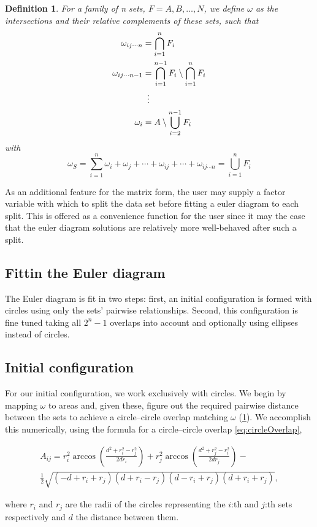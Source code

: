 \documentclass[a4paper,nofonts,nobib,titlepage,justified,marginals=raggedouter,nohyper]{tufte-handout}\usepackage[]{graphicx}\usepackage[]{color}
\newtheorem{mydef}{Definition}
\begin{document}
\begin{mydef}
\label{def:omega}
For a family of \emph{n} sets, $F = A, B, \dots, N$, we define $\omega$ as the
intersections and their relative complements of these sets, such that
\begin{align*}
  \omega_{ij \cdots n}   & = \bigcap_{i=1}^n F_i  \\
  \omega_{ij \cdots n-1} & = \bigcap_{i=1}^{n-1}F_i \setminus \bigcap_{i=1}^{n}F_i \\
                         & \vdotswithin{=} \\
                \omega_i & = A \setminus \bigcup_{i=2}^{n-1}F_i
\end{align*}
with
\[
  \omega_S = \sum_{i = 1}^n \omega_i + \omega_j + \cdots +  \omega_{ij} + \cdots + \omega_{ij\cdots n} =  \bigcup_{i=1}^n F_i
\]
\end{mydef}

As an additional feature for the matrix form, the user may supply a
factor variable with which to split the data set before fitting a euler
diagram to each split. This is offered as a convenience function for the user
since it may the case that the euler diagram solutions are relatively more
well-behaved after such a split.

\subsection{Fittin the Euler diagram}

The Euler diagram is fit in two steps: first, an initial configuration is
formed with circles using only the sets' pairwise relationships. Second, this
configuration is fine tuned taking all $2^n-1$ overlaps into account and
optionally using ellipses instead of circles.

\subsection{Initial configuration}
\label{sec:initConfig}

For our initial configuration, we work exclusively with circles. We begin by
mapping $\omega$ to areas and, given these, figure out the
required pairwise distance between the sets to achieve a circle--circle overlap
matching $\omega$ (\cref{def:omega}). We accomplish this numerically, using the
formula for a circle--circle overlap \eqref{eq:circleOverlap},
\begin{fullwidth}
\begin{multline}
A_{ij} = r_i^2\arccos\left(\frac{d^2 + r_i^2 - r_j^2}{2dr_i}\right) +
r_j^2\arccos\left(\frac{d^2 + r_j^2 - r_i^2}{2dr_j}\right) - \\
\frac{1}{2}\sqrt{(-d + r_i + r_j)(d + r_i - r_j)(d - r_i + r_j)(d + r_i + r_j)},
\label{eq:circleOverlap}
\end{multline}
\end{fullwidth}
where $r_i$ and $r_j$ are the radii of the circles representing the $i$:th and
$j$:th sets respectively and $d$ the distance between them.
\end{document}
